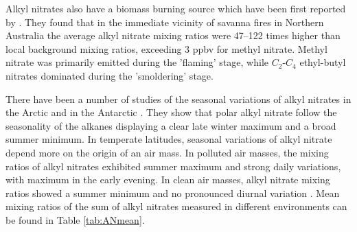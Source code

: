 \documentclass[11pt,a4paper]{article}
\begin{document}
Alkyl nitrates also have a biomass burning source which have been first reported by \citep{Simpson2002}. They found that in the immediate vicinity of savanna fires in Northern Australia the average alkyl nitrate mixing ratios were 47–122 times higher than local background mixing ratios, exceeding 3 ppbv for methyl nitrate. Methyl nitrate was primarily emitted during the 'flaming' stage, while $C_2$-$C_4$ ethyl-butyl nitrates dominated during the 'smoldering' stage.

There have been a number of studies of the seasonal variations of alkyl nitrates in the Arctic \citep{Swanson2003} and in the Antarctic \citep{Beyersdorf2010}. They show that polar alkyl nitrate follow the seasonality of the alkanes displaying a clear late winter maximum and a broad summer minimum. In temperate latitudes, seasonal variations of alkyl nitrate depend more on the origin of an air mass. In polluted air masses, the mixing ratios of alkyl nitrates exhibited summer maximum and strong daily variations, with maximum in the early evening. In clean air masses, alkyl nitrate mixing ratios showed a summer minimum and no pronounced diurnal variation \citep{Flocke1998}. Mean mixing ratios of the sum of alkyl nitrates measured in different environments can be found in Table \ref{tab:ANmean}.
\end{document}
